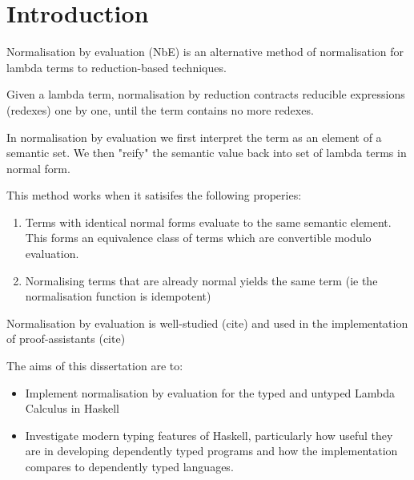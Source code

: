 \chapter{Introduction}
\label{chap:introduction}

Normalisation by evaluation (NbE) is an alternative method of normalisation for lambda terms to reduction-based techniques.

Given a lambda term, normalisation by reduction contracts reducible expressions (redexes) one by one, until the term contains no more redexes. 

In normalisation by evaluation we first interpret the term as an element of a semantic set. We then "reify" the semantic value back into set of lambda terms in normal form. 

This method works when it satisifes the following properies: 

\begin{enumerate}
    \item Terms with identical normal forms evaluate to the same semantic element. This forms an equivalence class of terms which are convertible modulo evaluation.
    \item Normalising terms that are already normal yields the same term (ie the normalisation function is idempotent)
\end{enumerate}


Normalisation by evaluation is well-studied (cite) and used in the implementation of proof-assistants (cite)




The aims of this dissertation are to:
\begin{itemize}
    \item Implement normalisation by evaluation for the typed and untyped Lambda Calculus in Haskell
    
    \item Investigate modern typing features of Haskell, particularly how useful they are in developing dependently typed programs and how the implementation compares to dependently typed languages.
\end{itemize}